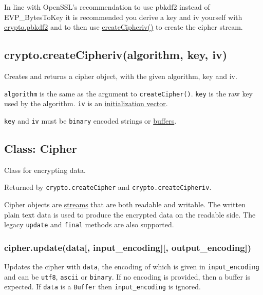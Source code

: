 In line with OpenSSL's recommendation to use pbkdf2 instead of
EVP\_BytesToKey it is recommended you derive a key and iv yourself with
\hyperref[cryptoux5fcryptoux5fpbkdf2ux5fpasswordux5fsaltux5fiterationsux5fkeylenux5fcallback]{crypto.pbkdf2}
and to then use
\hyperref[cryptoux5fcryptoux5fcreatecipherivux5falgorithmux5fkeyux5fiv]{createCipheriv()}
to create the cipher stream.

\subsection{crypto.createCipheriv(algorithm, key,
iv)}\label{crypto.createcipherivalgorithm-key-iv}

Creates and returns a cipher object, with the given algorithm, key and
iv.

\texttt{algorithm} is the same as the argument to
\texttt{createCipher()}. \texttt{key} is the raw key used by the
algorithm. \texttt{iv} is an
\href{http://en.wikipedia.org/wiki/Initialization_vector}{initialization
vector}.

\texttt{key} and \texttt{iv} must be
\texttt{\textquotesingle{}binary\textquotesingle{}} encoded strings or
\href{buffer.html}{buffers}.

\subsection{Class: Cipher}\label{class-cipher}

Class for encrypting data.

Returned by \texttt{crypto.createCipher} and
\texttt{crypto.createCipheriv}.

Cipher objects are \href{stream.html}{streams} that are both readable
and writable. The written plain text data is used to produce the
encrypted data on the readable side. The legacy \texttt{update} and
\texttt{final} methods are also supported.

\subsubsection{cipher.update(data{[}, input\_encoding{]}{[},
output\_encoding{]})}\label{cipher.updatedata-inputux5fencoding-outputux5fencoding}

Updates the cipher with \texttt{data}, the encoding of which is given in
\texttt{input\_encoding} and can be
\texttt{\textquotesingle{}utf8\textquotesingle{}},
\texttt{\textquotesingle{}ascii\textquotesingle{}} or
\texttt{\textquotesingle{}binary\textquotesingle{}}. If no encoding is
provided, then a buffer is expected. If \texttt{data} is a
\texttt{Buffer} then \texttt{input\_encoding} is ignored.

